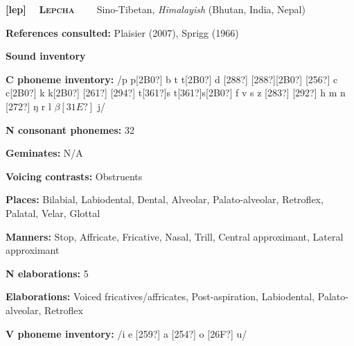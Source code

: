 \clearpage\begin{styleBody}
\textbf{[lep] }\ \ \textbf{\textsc{Lepcha}}\textbf{\ \ \ \ }Sino-Tibetan, \textit{Himalayish} (Bhutan, India, Nepal)
\end{styleBody}

\begin{styleBody}
\textbf{References consulted: }Plaisier (2007), Sprigg (1966)
\end{styleBody}

\begin{styleBody}
\textbf{Sound inventory}
\end{styleBody}

\begin{styleBody}
\textbf{C phoneme inventory:} /p p[2B0?] b t t[2B0?] d [288?] [288?][2B0?] [256?] c c[2B0?] k k[2B0?] [261?] [294?] t[361?]s t[361?]s[2B0?] f v s z [283?] [292?] h m n [272?] ŋ r l $\beta [31E?]$ j/
\end{styleBody}

\begin{styleBody}
\textbf{N consonant phonemes:} 32
\end{styleBody}

\begin{styleBody}
\textbf{Geminates:} N/A
\end{styleBody}

\begin{styleBody}
\textbf{Voicing contrasts:} Obstruents
\end{styleBody}

\begin{styleBody}
\textbf{Places:} Bilabial, Labiodental, Dental, Alveolar, Palato-alveolar, Retroflex, Palatal, Velar, Glottal
\end{styleBody}

\begin{styleBody}
\textbf{Manners:} Stop, Affricate, Fricative, Nasal, Trill, Central approximant, Lateral approximant
\end{styleBody}

\begin{styleBody}
\textbf{N elaborations:} 5
\end{styleBody}

\begin{styleBody}
\textbf{Elaborations:} Voiced fricatives/affricates, Post-aspiration, Labiodental, Palato-alveolar, Retroflex
\end{styleBody}

\begin{styleBody}
\textbf{V phoneme inventory:} /i e [259?] a [254?] o [26F?] u/
\end{styleBody}

